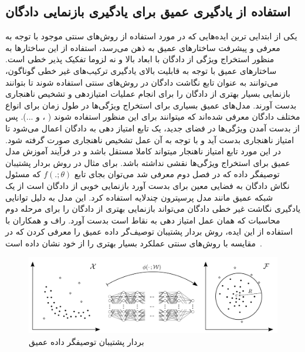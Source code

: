 \documentclass[12pt,a4paper]{report}
\theoremstyle{definition}
\theoremstyle{definition}
\begin{document}
	\subsection{استفاده از یادگیری عمیق برای یادگیری بازنمایی دادگان}
یکی از ابتدایی ترین ایده‌هایی که در مورد استفاده از روش‌های سنتی موجود با توجه به معرفی و پیشرفت ساختار‌های عمیق به ذهن می‌رسد، استفاده از این ساختار‌ها به منظور استخراج ویژگی از دادگان با ابعاد بالا و نه لزوما تفکیک پذیر خطی است. ساختار‌های عمیق با توجه به قابلیت بالای یادگیری ترکیب‌های غیر خطی گوناگون، می‌توانند به عنوان تابع نگاشت دادگان در روش‌های سنتی استفاده شوند تا بتوانند بازنمایی بسیار بهتری از دادگان را برای انجام عملیات امتیازدهی و تشخیص ناهنجاری بدست آورند.
مدل‌های عمیق بسیاری برای استخراج ویژگی‌ها در طول زمان برای انواع مختلف دادگان معرفی شده‌اند که میتوانند برای این منظور استفاده شوند
( 
،
و
...).
پس از بدست آمدن ویژگی‌ها در فضای جدید، یک تابع امتیاز دهی به دادگان اعمال می‌شود تا امتیاز ناهنجاری بدست آید و با توجه به آن عمل تشخیص ناهنجاری صورت گرفته شود. در این مورد تابع امتیاز ناهنجار میتواند کاملا مستقل باشد و در فرآیند آموزش مدل عمیق برای استخراج ویژگی‌ها نقشی نداشته باشد.
برای مثال در روش بردار پشتیبان توصیفگر داده که در فصل دوم معرفی شد می‌توان بجای تابع $f(.;\theta)$ که مسئول نگاش دادگان به فضایی معین برای بدست آورد بازنمایی خوبی از دادگان است از یک شبکه عمیق مانند مدل پرسپترون چندلایه استفاده کرد. این مدل به دلیل توانایی یادگیری نگاشت غیر خطی دادگان می‌تواند بازنمایی بهتری از دادگان را برای مرحله دوم محاسبات که همان عمل امتیاز دهی به نقاط است بدست آورد. راف و همکاران با استفاده از این ایده، روش بردار پشتیبان توصیف‌گر داده عمیق را معرفی کردن که در مقایسه با روش‌های سنتی عملکرد بسیار بهتری را از خود نشان داده است~\cite{pmlr-v80-ruff18a}.

\begin{figure}[!h]
	\begin{center}
		\includegraphics[width=\linewidth]{./images/figures/deep-svdd.png}
	\end{center}
	\caption{بردار پشتیبان توصیفگر داده عمیق~\cite{pmlr-v80-ruff18a}}
	\label{fig:deep-svdd}
	\centering
\end{figure}
\end{document}
